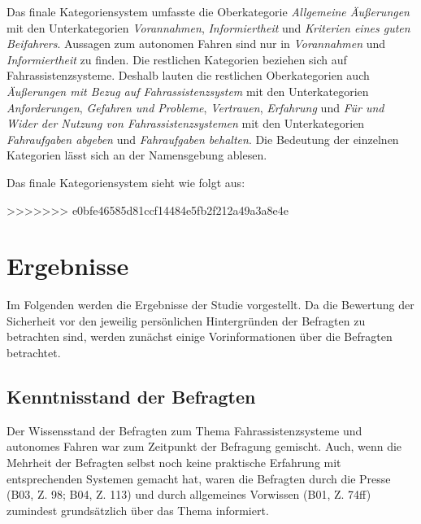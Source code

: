 \documentclass[12pt]{article}
\begin{document}
Das finale Kategoriensystem umfasste die Oberkategorie \emph{Allgemeine Äußerungen} mit den Unterkategorien \emph{Vorannahmen}, \emph{Informiertheit} und \emph{Kriterien eines guten Beifahrers}. Aussagen zum autonomen Fahren sind nur in \emph{Vorannahmen} und \emph{Informiertheit} zu finden. Die restlichen Kategorien beziehen sich auf Fahrassistenzsysteme. Deshalb lauten die restlichen Oberkategorien auch \emph{Äußerungen mit Bezug auf Fahrassistenzsystem} mit den Unterkategorien \emph{Anforderungen}, \emph{Gefahren und Probleme}, \emph{Vertrauen}, \emph{Erfahrung} und \emph{Für und Wider der Nutzung von Fahrassistenzsystemen} mit den Unterkategorien \emph{Fahraufgaben abgeben} und \emph{Fahraufgaben behalten}. Die Bedeutung der einzelnen Kategorien lässt sich an der Namensgebung ablesen.

Das finale Kategoriensystem sieht wie folgt aus:

>>>>>>> e0bfe46585d81ccf14484e5fb2f212a49a3a8e4e

\clearpage
\section{Ergebnisse}
Im Folgenden werden die Ergebnisse der Studie vorgestellt. Da die Bewertung der Sicherheit vor den jeweilig persönlichen Hintergründen der Befragten zu betrachten sind, werden zunächst einige Vorinformationen über die Befragten betrachtet.

%
%

\subsection{Kenntnisstand der Befragten}
Der Wissensstand der Befragten zum Thema Fahrassistenzsysteme und autonomes Fahren war zum Zeitpunkt der Befragung gemischt. Auch, wenn die Mehrheit der Befragten selbst noch keine praktische Erfahrung mit entsprechenden Systemen gemacht hat, waren die Befragten durch die Presse (B03, Z. 98; B04, Z. 113) und durch allgemeines Vorwissen (B01, Z. 74ff) zumindest grundsätzlich über das Thema informiert.
\end{document}
